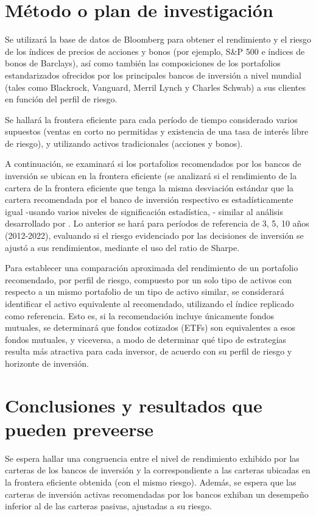 \documentclass[a4paper,fleqn]{cas-sc}
\begin{document}
\section{Método o plan de investigación} 
Se utilizará la base de datos de Bloomberg para obtener el
rendimiento y el riesgo de los índices de precios de acciones y bonos (por ejemplo, S\&P 500 e índices
de bonos de Barclays), así como también las composiciones de los portafolios estandarizados ofrecidos
por los principales bancos de inversión a nivel mundial (tales como Blackrock, Vanguard, Merril Lynch
y Charles Schwab) a sus clientes en función del perfil de riesgo.

Se hallará la frontera eficiente para cada período de tiempo considerado varios supuestos (ventas en
corto no permitidas y existencia de una tasa de interés libre de riesgo), y utilizando activos
tradicionales (acciones y bonos).

A continuación, se examinará si los portafolios recomendados por los bancos de inversión se ubican
en la frontera eficiente (se analizará si el rendimiento de la cartera de la frontera eficiente que tenga
la misma desviación estándar que la cartera recomendada por el banco de inversión respectivo es 
estadísticamente igual -usando varios niveles de significación estadística, - similar al análisis
desarrollado por \cite{Garay2005}. Lo anterior se hará para períodos de referencia de 3,
5, 10 años (2012-2022), evaluando si el riesgo evidenciado por las decisiones de inversión se ajustó a
sus rendimientos, mediante el uso del ratio de Sharpe.

Para establecer una comparación aproximada del rendimiento de un portafolio recomendado, por
perfil de riesgo, compuesto por un solo tipo de activos con respecto a un mismo portafolio de un tipo
de activo similar, se considerará identificar el activo equivalente al recomendado, utilizando el índice
replicado como referencia. Esto es, si la recomendación incluye únicamente fondos mutuales, se
determinará que fondos cotizados (ETFs) son equivalentes a esos fondos mutuales, y viceversa, a
modo de determinar qué tipo de estrategias resulta más atractiva para cada inversor, de acuerdo con
su perfil de riesgo y horizonte de inversión.

\section{Conclusiones y resultados que pueden preveerse} 
Se espera hallar una congruencia entre el nivel de
rendimiento exhibido por las carteras de los bancos de inversión y la correspondiente a las carteras
ubicadas en la frontera eficiente obtenida (con el mismo riesgo). Además, se espera que las carteras
de inversión activas recomendadas por los bancos exhiban un desempeño inferior al de las carteras
pasivas, ajustadas a su riesgo.

\printcredits





\bio{}
\endbio
\end{document}
